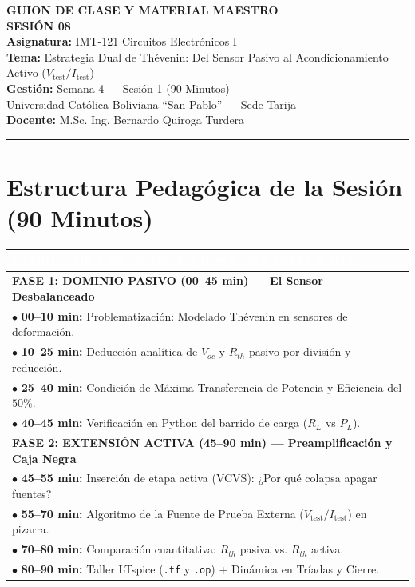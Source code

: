 \documentclass[11pt, a4paper]{article}
\begin{document}
\begin{center}
    {\LARGE \textbf{GUION DE CLASE Y MATERIAL MAESTRO}} \\[0.2cm]
    {\Large \textbf{SESIÓN 08}} \\[0.4cm]
    \normalsize
    \textbf{Asignatura:} IMT-121 Circuitos Electrónicos I \\
    \textbf{Tema:} Estrategia Dual de Thévenin: Del Sensor Pasivo al Acondicionamiento Activo ($V_{\text{test}} / I_{\text{test}}$) \\
    \textbf{Gestión:} Semana 4 — Sesión 1 (90 Minutos) \\
    Universidad Católica Boliviana ``San Pablo'' — Sede Tarija \\[0.2cm]
    \textbf{Docente:} M.Sc. Ing. Bernardo Quiroga Turdera
    \vspace{0.4cm}
\end{center}
\hrule
\vspace{0.5cm}

\section*{Estructura Pedagógica de la Sesión (90 Minutos)}
\begin{center}
    \renewcommand{\arraystretch}{1.3}
    \begin{tabularx}{\textwidth}{|X|}
        \hline
        \cellcolor{ucbblue}\textcolor{white}{\textbf{ESTRUCTURA DE CLASE EN DOS FASES INTEGRADAS}} \\
        \hline
        \cellcolor{gray!10}\textbf{FASE 1: DOMINIO PASIVO (00–45 min) — El Sensor Desbalanceado} \\
        $\bullet$ \textbf{00–10 min:} Problematización: Modelado Thévenin en sensores de deformación. \\
        $\bullet$ \textbf{10–25 min:} Deducción analítica de $V_{oc}$ y $R_{th}$ pasivo por división y reducción. \\
        $\bullet$ \textbf{25–40 min:} Condición de Máxima Transferencia de Potencia y Eficiencia del $50\%$. \\
        $\bullet$ \textbf{40–45 min:} Verificación en Python del barrido de carga ($R_L$ vs $P_L$). \\
        \hline
        \cellcolor{gray!10}\textbf{FASE 2: EXTENSIÓN ACTIVA (45–90 min) — Preamplificación y Caja Negra} \\
        $\bullet$ \textbf{45–55 min:} Inserción de etapa activa (VCVS): ¿Por qué colapsa apagar fuentes? \\
        $\bullet$ \textbf{55–70 min:} Algoritmo de la Fuente de Prueba Externa ($V_{\text{test}} / I_{\text{test}}$) en pizarra. \\
        $\bullet$ \textbf{70–80 min:} Comparación cuantitativa: $R_{th}$ pasiva vs. $R_{th}$ activa. \\
        $\bullet$ \textbf{80–90 min:} Taller LTspice (\texttt{.tf} y \texttt{.op}) + Dinámica en Tríadas y Cierre. \\
        \hline
    \end{tabularx}
\end{center}
\end{document}
